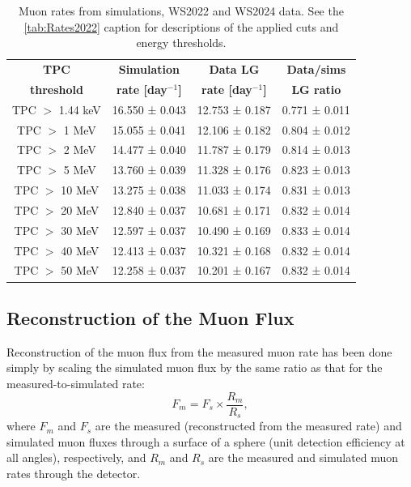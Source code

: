 \begin{center}
\begin{minipage}{\textwidth}
\def\arraystretch{1.4}%
\centering
\begin{longtable}[hbtp]{|c|c|c|c|}
\caption{Muon rates from simulations, WS2022 and WS2024 data. See the \autoref{tab:Rates2022} caption for descriptions of the applied cuts and energy thresholds. \newline}
\label{tab:Rates_all}\\
\hline
\multicolumn{1}{|c|}{\textbf{TPC}} & \multicolumn{1}{c|}{\textbf{Simulation}} & \multicolumn{1}{c|}{\textbf{Data LG}} & \multicolumn{1}{c|}{\textbf{Data/sims}}  \\ 
\multicolumn{1}{|c|}{\textbf{threshold}} & \multicolumn{1}{c|}{\textbf{rate [day$^{-1}$]}} & \multicolumn{1}{c|}{\textbf{rate [day$^{-1}$]}} & \multicolumn{1}{c|}{\textbf{LG ratio}}  \\ \hline 
\endfirsthead \hline
\endlastfoot
TPC $>$ 1.44 keV & 16.550 ± 0.043 & 12.753 ± 0.187 & 0.771 ± 0.011 \\ \hline
TPC $>$ 1 MeV & 15.055 ± 0.041 & 12.106 ± 0.182 & 0.804 ± 0.012\\ \hline
TPC $>$ 2 MeV & 14.477 ± 0.040 & 11.787 ± 0.179 & 0.814 ± 0.013 \\ \hline
TPC $>$ 5 MeV & 13.760 ± 0.039 & 11.328 ± 0.176 & 0.823 ± 0.013  \\ \hline
TPC $>$ 10 MeV & 13.275 ± 0.038 & 11.033 ± 0.174 & 0.831 ± 0.013 \\ \hline
TPC $>$ 20 MeV & 12.840 ± 0.037 & 10.681 ± 0.171 & 0.832 ± 0.014  \\ \hline
TPC $>$ 30 MeV & 12.597 ± 0.037 & 10.490 ± 0.169 & 0.833 ± 0.014  \\ \hline
TPC $>$ 40 MeV & 12.413 ± 0.037 & 10.321 ± 0.168 & 0.832 ± 0.014  \\ \hline
TPC $>$ 50 MeV & 12.258 ± 0.037 & 10.201 ± 0.167 & 0.832 ± 0.014 \\
\hline
\end{longtable}
\end{minipage}%
\end{center}

\subsection{Reconstruction of the Muon Flux}
Reconstruction of the muon flux from the measured muon rate has been done simply by scaling the simulated muon flux by the same ratio as that for the measured-to-simulated rate:
\begin{equation}
    F_{m} = F_{s} \times \frac{R_m}{R_s},
\label{eq:flux}
\end{equation}
where $F_{m}$ and $F_{s}$ are the measured (reconstructed from the measured rate) and simulated muon fluxes through a surface of a sphere (unit detection efficiency at all angles), respectively, and $R_{m}$ and $R_{s}$ are the measured and simulated muon rates through the detector.

